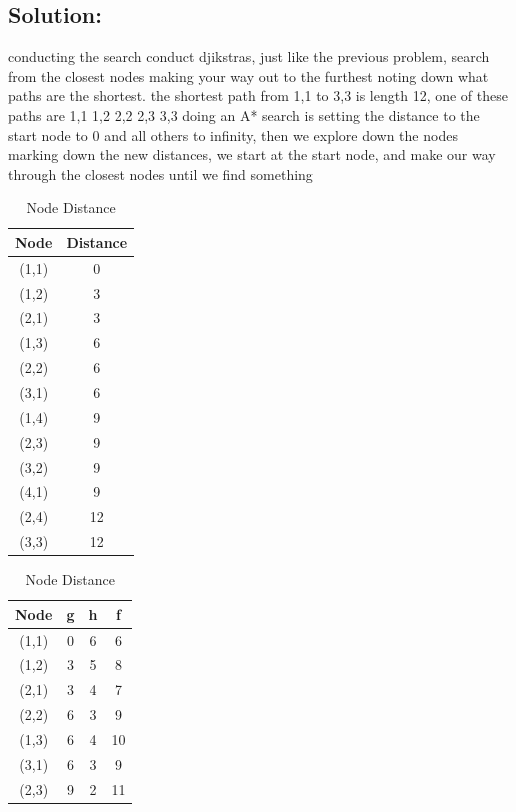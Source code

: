 \documentclass[12pt]{article}
\begin{document}
\subsection*{\textbf{Solution:}}
conducting the search conduct djikstras, just like the previous problem, search from the closest nodes making your way out to the furthest noting down what paths are the shortest. the shortest path from 1,1 to 3,3 is length 12, one of these paths are 1,1 1,2 2,2 2,3 3,3
\newline doing an A* search is setting the distance to the start node to 0 and all others to infinity, then we explore down the nodes marking down the new distances, we start at the start node, and make our way through the closest nodes until we find something 
\begin{table}[h]
    \centering
    \caption{Node Distance}
    \begin{tabular}{|c|c|}
    \hline
    Node & Distance \\
    \hline
    (1,1) & 0 \\
    (1,2) & 3 \\
    (2,1) & 3 \\
    (1,3) & 6 \\
    (2,2) & 6 \\
    (3,1) & 6 \\
    (1,4) & 9 \\
    (2,3) & 9 \\
    (3,2) & 9 \\
    (4,1) & 9 \\
    (2,4) & 12 \\
    (3,3) & 12 \\
    \hline
    \end{tabular}
    \label{tab:node_distance}
\end{table}

\begin{table}[h]
    \centering
    \caption{Node Distance}
    \begin{tabular}{|c|c|c|c|}
    \hline
    Node & g & h & f \\
    \hline
    (1,1) & 0 & 6 & 6 \\
    (1,2) & 3 & 5 & 8 \\
    (2,1) & 3 & 4 & 7 \\
    (2,2) & 6 & 3 & 9 \\
    (1,3) & 6 & 4 & 10 \\
    (3,1) & 6 & 3 & 9 \\
    (2,3) & 9 & 2 & 11 \\
    \hline
    \end{tabular}
    \label{tab:node_distance}
\end{table}
\newpage
\end{document}
